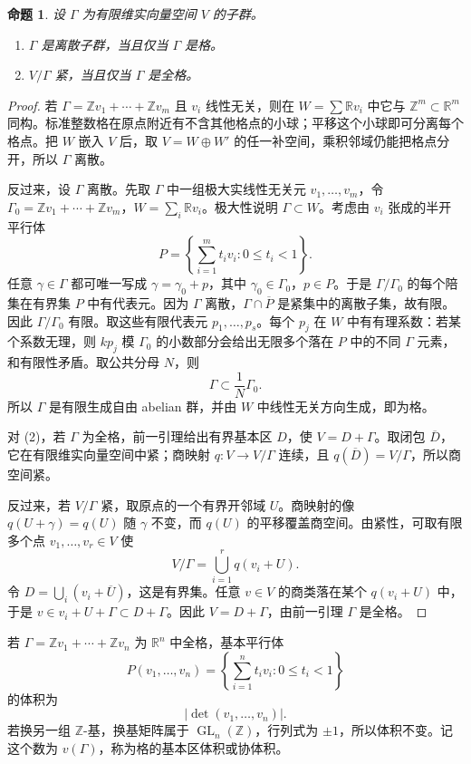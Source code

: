\documentclass[11pt,a4paper,openany]{ctexbook}
\numberwithin{equation}{chapter}
\newcommand{\R}{\mathbb{R}}
\newcommand{\Z}{\mathbb{Z}}
\newcommand{\GL}{\operatorname{GL}}
\theoremstyle{plain}
\newtheorem{proposition}[theorem]{命题}
\theoremstyle{definition}
\theoremstyle{remark}
\begin{document}
\begin{proposition}
设 $\Gamma$ 为有限维实向量空间 $V$ 的子群。
\begin{enumerate}[label=(\arabic*)]
\item $\Gamma$ 是离散子群，当且仅当 $\Gamma$ 是格。
\item $V/\Gamma$ 紧，当且仅当 $\Gamma$ 是全格。
\end{enumerate}
\end{proposition}

\begin{proof}
若 $\Gamma=\Z v_1+\cdots+\Z v_m$ 且 $v_i$ 线性无关，则在
$W=\sum\R v_i$ 中它与 $\Z^m\subset\R^m$ 同构。标准整数格在原点附近有不含其他格点的小球；平移这个小球即可分离每个格点。把 $W$ 嵌入
$V$ 后，取 $V=W\oplus W'$ 的任一补空间，乘积邻域仍能把格点分开，所以 $\Gamma$ 离散。

反过来，设 $\Gamma$ 离散。先取 $\Gamma$ 中一组极大实线性无关元
$v_1,\dots,v_m$，令 $\Gamma_0=\Z v_1+\cdots+\Z v_m$，$W=\sum_i\R v_i$。极大性说明
$\Gamma\subset W$。考虑由 $v_i$ 张成的半开平行体
\[
P=\left\{\sum_{i=1}^m t_iv_i:0\le t_i<1\right\}.
\]
任意 $\gamma\in\Gamma$ 都可唯一写成 $\gamma=\gamma_0+p$，其中
$\gamma_0\in\Gamma_0$，$p\in P$。于是 $\Gamma/\Gamma_0$ 的每个陪集在有界集
$P$ 中有代表元。因为 $\Gamma$ 离散，$\Gamma\cap\overline P$ 是紧集中的离散子集，故有限。因此 $\Gamma/\Gamma_0$ 有限。取这些有限代表元
$p_1,\dots,p_s$。每个 $p_j$ 在 $W$ 中有有理系数：若某个系数无理，则
$kp_j$ 模 $\Gamma_0$ 的小数部分会给出无限多个落在 $P$ 中的不同
$\Gamma$ 元素，和有限性矛盾。取公共分母 $N$，则
\[
\Gamma\subset \frac1N\Gamma_0.
\]
所以 $\Gamma$ 是有限生成自由 abelian 群，并由 $W$ 中线性无关方向生成，即为格。

对 (2)，若 $\Gamma$ 为全格，前一引理给出有界基本区 $D$，使
$V=D+\Gamma$。取闭包 $\overline D$，它在有限维实向量空间中紧；商映射
$q:V\to V/\Gamma$ 连续，且 $q(\overline D)=V/\Gamma$，所以商空间紧。

反过来，若 $V/\Gamma$ 紧，取原点的一个有界开邻域 $U$。商映射的像
$q(U+\gamma)=q(U)$ 随 $\gamma$ 不变，而 $q(U)$ 的平移覆盖商空间。由紧性，可取有限多个点
$v_1,\dots,v_r\in V$ 使
\[
V/\Gamma=\bigcup_{i=1}^r q(v_i+U).
\]
令 $D=\bigcup_i(v_i+\overline U)$，这是有界集。任意 $v\in V$ 的商类落在某个
$q(v_i+U)$ 中，于是 $v\in v_i+U+\Gamma\subset D+\Gamma$。因此
$V=D+\Gamma$，由前一引理 $\Gamma$ 是全格。
\end{proof}

若 $\Gamma=\Z v_1+\cdots+\Z v_n$ 为 $\R^n$ 中全格，基本平行体
\[
P(v_1,\dots,v_n)=\left\{\sum_{i=1}^n t_iv_i:0\le t_i<1\right\}
\]
的体积为
\[
|\det(v_1,\dots,v_n)|.
\]
若换另一组 $\Z$-基，换基矩阵属于 $\GL_n(\Z)$，行列式为 $\pm1$，所以体积不变。记这个数为 $v(\Gamma)$，称为格的基本区体积或协体积。
\end{document}
